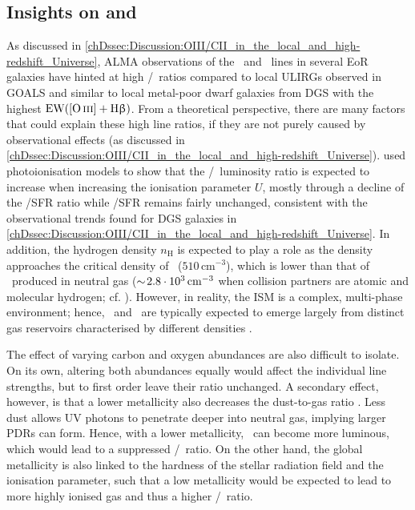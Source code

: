 \subsection{Insights on \texorpdfstring{\OIIILam}{[O III] 88 μm} and \texorpdfstring{\CIILam}{[C II] 158 μm}}
\label{chDssec:Discussion:OIII/CII_theoretical_insights}

As discussed in \cref{chDssec:Discussion:OIII/CII_in_the_local_and_high-redshift_Universe}, ALMA observations of the \OIIILam\ and \CIILam\ lines in several EoR galaxies have hinted at high \OIIIf/\CII\ ratios compared to local ULIRGs observed in GOALS and similar to local metal-poor dwarf galaxies from DGS with the highest $\text{EW} ( \OIIIf + \Hbeta )$. From a theoretical perspective, there are many factors that could explain these high line ratios, if they are not purely caused by observational effects (as discussed in \cref{chDssec:Discussion:OIII/CII_in_the_local_and_high-redshift_Universe}). \citet{2020ApJ...896...93H} used  photoionisation models to show that the \OIIIf/\CII\ luminosity ratio is expected to increase when increasing the ionisation parameter $U$, mostly through a decline of the \CII/SFR ratio while \OIIIf/SFR remains fairly unchanged, consistent with the observational trends found for DGS galaxies in \cref{chDssec:Discussion:OIII/CII_in_the_local_and_high-redshift_Universe}. In addition, the hydrogen density $n_\text{H}$ is expected to play a role as the density approaches the critical density of \OIIIf\ ($510 \, \mathrm{cm^{-3}}$), which is lower than that of \CII\ produced in neutral gas ($\sim \! 2.8 \cdot 10^3 \, \mathrm{cm^{-3}}$ when collision partners are atomic and molecular hydrogen; cf. \citealt{2013ARA&A..51..105C}). However, in reality, the ISM is a complex, multi-phase environment; hence, \CII\ and \OIIIf\ are typically expected to emerge largely from distinct gas reservoirs characterised by different densities \citep[e.g.][]{2022MNRAS.510.5603K, 2022MNRAS.513.5621P}.

The effect of varying carbon and oxygen abundances are also difficult to isolate. On its own, altering both abundances equally would affect the individual line strengths, but to first order leave their ratio unchanged. A secondary effect, however, is that a lower metallicity also decreases the dust-to-gas ratio \citep{2018ARA&A..56..673G}. Less dust allows UV photons to penetrate deeper into neutral gas, implying larger PDRs can form. Hence, with a lower metallicity, \CII\ can become more luminous, which would lead to a suppressed \OIIIf/\CII\ ratio. On the other hand, the global metallicity is also linked to the hardness of the stellar radiation field and the ionisation parameter, such that a low metallicity would be expected to lead to more highly ionised gas and thus a higher \OIIIf/\CII\ ratio.

